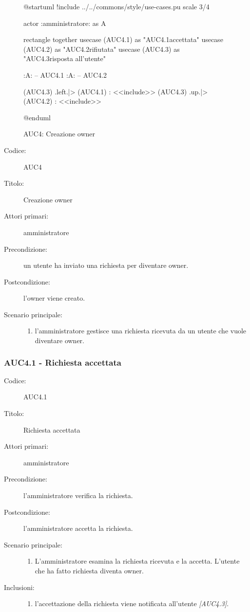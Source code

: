 \documentclass[../../../analisi-dei-requisiti.tex]{subfiles}
\begin{document}
\begin{figure}[h!]
  \centering
  \begin{plantuml}
  @startuml
  !include ../../commons/style/use-cases.pu
  scale 3/4

  actor :amministratore: as A

  rectangle {
    together {
      usecase (AUC4.1) as "AUC4.1\nRichiesta accettata"
      usecase (AUC4.2) as "AUC4.2\nRichiesta rifiutata"
    }
    usecase (AUC4.3) as "AUC4.3\nInvio risposta all'utente"
  }

  :A: -- AUC4.1
  :A: -- AUC4.2

  (AUC4.3) .left.|> (AUC4.1) : <<include>>
  (AUC4.3) .up.|> (AUC4.2) : <<include>>

  @enduml
  \end{plantuml}
  \caption{AUC4: Creazione owner}
  \label{fig:AUC4}
\end{figure}

\begin{description}
  \item[Codice:] AUC4
  \item[Titolo:] Creazione owner
  \item[Attori primari:] amministratore
  \item[Precondizione:] un utente ha inviato una richiesta per diventare owner.
  \item[Postcondizione:] l'owner viene creato.
  \item[Scenario principale:]
  \begin{enumerate}
    \item l'amministratore gestisce una richiesta ricevuta da un utente che vuole diventare owner.
  \end{enumerate}
\end{description}


\subsubsection{AUC4.1 - Richiesta accettata}%
\label{subsub:AUC4.1}

\begin{description}
  \item[Codice:] AUC4.1
  \item[Titolo:] Richiesta accettata
  \item[Attori primari:] amministratore
  \item[Precondizione:] l'amministratore verifica la richiesta.
  \item[Postcondizione:] l'amministratore accetta la richiesta.
  \item[Scenario principale:]
  \begin{enumerate}
    \item L'amministratore esamina la richiesta ricevuta e la accetta. L'utente che ha fatto richiesta diventa owner.
  \end{enumerate}
  \item[Inclusioni:]
  \begin{enumerate}
    \item l'accettazione della richiesta viene notificata all'utente \emph{[AUC4.3]}.
  \end{enumerate}
\end{description}
\end{document}
